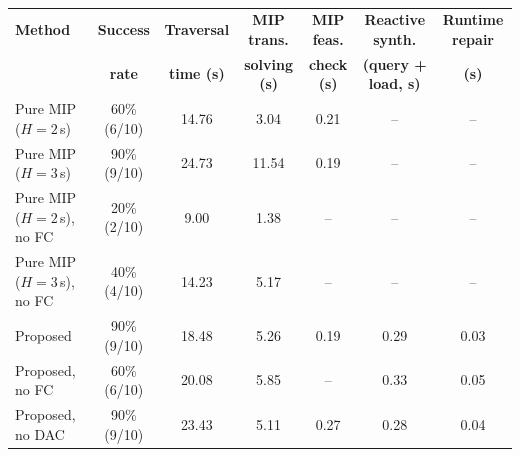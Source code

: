 \begin{table}[t]
\centering
\caption{}
\label{tab:pure_mip_benchmark}
\setlength{\tabcolsep}{4pt}
{\color{blue}
\begin{tabular}{lcccccc}
\hline
\textbf{Method} & \textbf{Success} & \textbf{Traversal} & \textbf{MIP trans.} & \textbf{MIP feas.} & \textbf{Reactive synth.} & \textbf{Runtime repair} \\
 & \textbf{rate} & \textbf{time (s)} & \textbf{solving (s)} & \textbf{check (s)} & \textbf{(query + load, s)} & \textbf{(s)} \\
\hline
Pure MIP ($H{=}2$\,s)                              & 60\% (6/10) & 14.76 &  3.04 & 0.21 & --   & --   \\
Pure MIP ($H{=}3$\,s)                              & 90\% (9/10) & 24.73 & 11.54 & 0.19 & --   & --   \\
Pure MIP ($H{=}2$\,s), no FC        & 20\% (2/10) &  9.00 &  1.38 & --   & --   & --   \\
Pure MIP ($H{=}3$\,s), no FC        & 40\% (4/10) & 14.23 &  5.17 & --   & --   & --   \\
\hline
Proposed                                           & 90\% (9/10) & 18.48 &  5.26 & 0.19 & 0.29 & 0.03 \\
Proposed, no FC                     & 60\% (6/10) & 20.08 &  5.85 & --   & 0.33 & 0.05 \\
Proposed, no DAC & 90\% (9/10) & 23.43 &  5.11 & 0.27 & 0.28 & 0.04 \\
\hline
\end{tabular}
}
\end{table}

